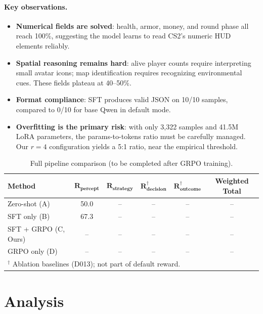 \documentclass{article}
\begin{document}
\paragraph{Key observations.}
\begin{itemize}
    \item \textbf{Numerical fields are solved}: health, armor, money, and round phase all reach 100\%, suggesting the model learns to read CS2's numeric HUD elements reliably.
    \item \textbf{Spatial reasoning remains hard}: alive player counts require interpreting small avatar icons; map identification requires recognizing environmental cues. These fields plateau at 40--50\%.
    \item \textbf{Format compliance}: SFT produces valid JSON on 10/10 samples, compared to 0/10 for base Qwen in default mode.
    \item \textbf{Overfitting is the primary risk}: with only 3{,}322 samples and 41.5M LoRA parameters, the params-to-tokens ratio must be carefully managed. Our $r{=}4$ configuration yields a 5:1 ratio, near the empirical threshold.
\end{itemize}

\begin{table}[t]
\centering
\caption{Full pipeline comparison (to be completed after GRPO training).}
\label{tab:results}
\begin{tabular}{lccccc}
\toprule
\textbf{Method} & $\mathbf{R_\text{percept}}$ & $\mathbf{R_\text{strategy}}$ & $\mathbf{R_\text{decision}^\dagger}$ & $\mathbf{R_\text{outcome}^\dagger}$ & \textbf{Weighted Total} \\
\midrule
Zero-shot (A) & 50.0 & -- & -- & -- & -- \\
SFT only (B) & 67.3 & -- & -- & -- & -- \\
SFT + GRPO (C, Ours) & -- & -- & -- & -- & -- \\
GRPO only (D) & -- & -- & -- & -- & -- \\
\bottomrule
\multicolumn{6}{l}{\small $^\dagger$ Ablation baselines (D013); not part of default reward.} \\
\end{tabular}
\end{table}

\section{Analysis}
\label{sec:analysis}
\end{document}
